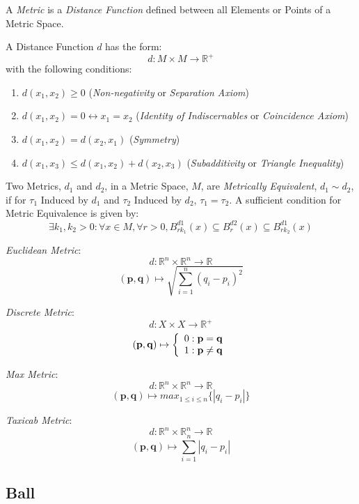 \documentclass{article}
\begin{document}
A \emph{Metric} is a \emph{Distance Function} defined between all
Elements or Points of a Metric Space.

A Distance Function $d$ has the form:
\[
    d: M \times M \rightarrow \mathbb{R}^{+}
\]
with the following conditions:
\begin{enumerate}
\item $d(x_1, x_2) \geq 0$ (\emph{Non-negativity} or \emph{Separation
  Axiom})
\item $d(x_1, x_2) = 0 \leftrightarrow x_1 = x_2$ (\emph{Identity of
  Indiscernables} or \emph{Coincidence Axiom})
\item $d(x_1, x_2) = d(x_2, x_1)$ (\emph{Symmetry})
\item $d(x_1, x_3) \leq d(x_1, x_2) + d(x_2, x_3)$
  (\emph{Subadditivity} or \emph{Triangle Inequality})
\end{enumerate}
Two Metrics, $d_1$ and $d_2$, in a Metric Space, $M$, are
\emph{Metrically Equivalent}, $d_1 \sim d_2$, if for $\tau_1$ Induced
by $d_1$ and $\tau_2$ Induced by $d_2$, $\tau_1 = \tau_2$. A
sufficient condition for Metric Equivalence is given by:
\[
    \exists k_1, k_2 > 0 : \forall x \in M, \forall r > 0,
    B^{d1}_{rk_1}(x) \subseteq B^{d2}_r (x) \subseteq B^{d1}_{rk_2}(x)
\]

\emph{Euclidean Metric}:
\[
    d: \mathbb{R}^n \times \mathbb{R}^n \rightarrow \mathbb{R}
\]\[
    (\mathbf{p},\mathbf{q}) \mapsto \sqrt{\sum_{i=1}^{n}(q_i - p_i)^2}
\]

\emph{Discrete Metric}:
\[
    d: X \times X \rightarrow \mathbb{R}^{+}
\]\[
    (\mathbf{p},\mathbf{q}) \mapsto \left\{
    \begin{array}{l l}
        0: \mathbf{p} = \mathbf{q}\\
        1: \mathbf{p} \neq \mathbf{q}
    \end{array}\right.
\]

\emph{Max Metric}:
\[
    d: \mathbb{R}^n \times \mathbb{R}^n \rightarrow \mathbb{R}
\]\[
    (\mathbf{p},\mathbf{q}) \mapsto max_{1 \leq i \leq n}\{|q_i - p_i|\}
\]

\emph{Taxicab Metric}:
\[
    d: \mathbb{R}^n \times \mathbb{R}^n \rightarrow \mathbb{R}
\]\[
    (\mathbf{p},\mathbf{q}) \mapsto \sum_{i=1}^{n}|q_i - p_i|
\]



\subsection{Ball}\label{subsec:metric_ball}
\end{document}
